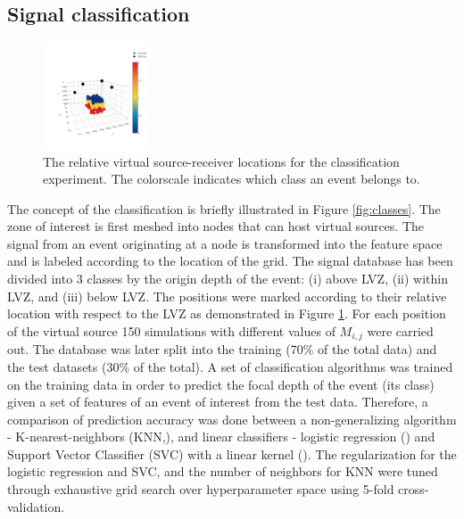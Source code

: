 \documentclass[letterpaper,11pt]{article}
\begin{document}
\subsection*{Signal classification}
\begin{figure}
\vspace{-16mm}
\centering
\includegraphics[width=0.28\textwidth]{./AntonBiryukov_bibtex/figure_foxcreek_classes.png}
\vspace{-4mm}
\caption{The relative virtual source-receiver locations for the classification experiment. The colorscale indicates which class an event belongs to.}
\label{fig:foxcreek_classes}
\end{figure}
The concept of the classification is briefly illustrated in Figure \ref{fig:classes}. The zone of interest is first meshed into nodes that can host virtual sources. The signal from an event originating at a node is transformed into the feature space and is labeled according to the location of the grid. The signal database has been divided into 3 classes by the origin depth of the event: (i) above LVZ, (ii) within LVZ, and (iii) below LVZ.
The positions were marked according to their relative location with respect to the LVZ as demonstrated in Figure \ref{fig:foxcreek_classes}. For each position of the virtual source 150 simulations with different values of $M_{i,j}$ were carried out. The database was later split into the training (70\% of the total data) and the test datasets (30\% of the total). 
A set of classification algorithms was trained on the training data in order to predict the focal depth of the event (its class) given a set of features of an event of interest from the test data. Therefore, a comparison of prediction accuracy was done between a non-generalizing algorithm - K-nearest-neighbors (KNN,\cite{cover_nearest_1967}), and linear classifiers - logistic regression (\cite{jr_applied_2004}) and Support Vector Classifier (SVC) with a linear kernel (\cite{Guyon93automaticcapacity}). The regularization for the logistic regression and SVC, and the number of neighbors for KNN were tuned through exhaustive grid search over hyperparameter space using 5-fold cross-validation.
\end{document}
